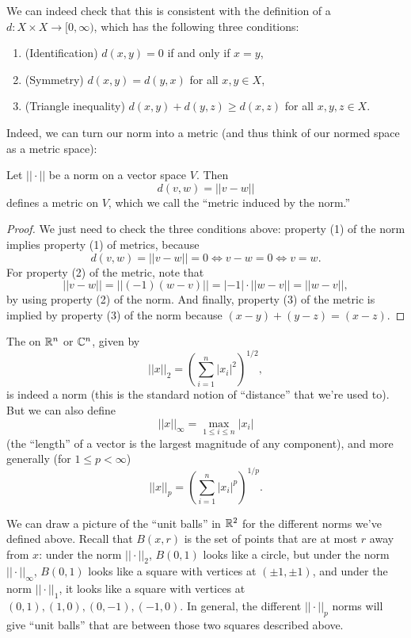 We can indeed check that this is consistent with the definition of a  $d: X \times X \to [0, \infty)$, which has the following three conditions:
\begin{enumerate}
    \item (Identification) $d(x, y) = 0$ if and only if $x = y$,
    \item (Symmetry) $d(x, y) = d(y, x)$ for all $x, y \in X$,
    \item (Triangle inequality) $d(x, y) + d(y, z) \ge d(x, z)$ for all $x, y, z \in X$.
\end{enumerate}

Indeed, we can turn our norm into a metric (and thus think of our normed space as a metric space):

\begin{proposition}
Let $||\cdot||$ be a norm on a vector space $V$. Then 
\[
    d(v, w) = ||v-w|| 
\]
defines a metric on $V$, which we call the ``metric induced by the norm.''
\end{proposition}
\begin{proof}
We just need to check the three conditions above: property (1) of the norm implies property (1) of metrics, because 
\[
    d(v, w) = ||v-w|| = 0 \iff v-w = 0 \iff v = w.
\]
For property (2) of the metric, note that 
\[
    ||v-w|| = ||(-1)(w-v)|| = |-1| \cdot ||w-v|| = ||w-v||,
\]
by using property (2) of the norm. And finally, property (3) of the metric is implied by property (3) of the norm because $(x-y) + (y-z) = (x-z)$.
\end{proof}

\begin{example}
The  on $\mathbb R^n$ or $\mathbb C^n$, given by 
\[
    ||x||_2 = \left( \sum_{i=1}^n |x_i|^2\right)^{1/2},
\]
is indeed a norm (this is the standard notion of ``distance'' that we're used to). But we can also define 
\[
    ||x||_{\infty} = \max_{1 \le i \le n} |x_i|
\]
(the ``length'' of a vector is the largest magnitude of any component), and more generally (for $1 \le p < \infty$)
\[
    ||x||_p = \left(\sum_{i=1}^n |x_i|^p\right)^{1/p}.
\]
\end{example}

We can draw a picture of the ``unit balls'' in $\mathbb R^2$ for the different norms we've defined above. Recall that $B(x, r)$ is the set of points that are at most $r$ away from $x$: under the norm $||\cdot||_2$, $B(0, 1)$ looks like a circle, but under the norm $||\cdot||_\infty$, $B(0, 1)$ looks like a square with vertices at $(\pm 1, \pm 1)$, and under the norm $||\cdot||_1$, it looks like a square with vertices at $(0, 1), (1, 0), (0, -1), (-1, 0)$. In general, the different $||\cdot||_p$ norms will give ``unit balls'' that are between those two squares described above. 

